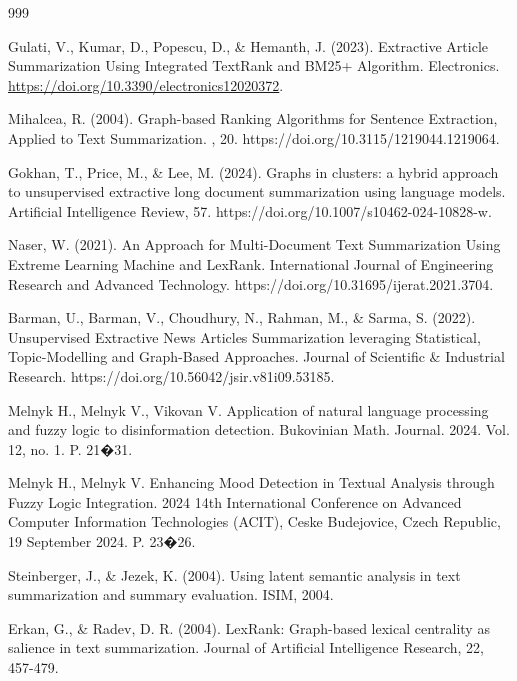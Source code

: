 \documentclass[12pt,twoside,en,win]{bmzhart}
\begin{document}
	
	\begin{thebibliography}{999}
		
		 Gulati, V., Kumar, D., Popescu, D., \& Hemanth, J. (2023). Extractive Article Summarization Using 
		Integrated TextRank and BM25+ Algorithm. Electronics. \url{https://doi.org/10.3390/electronics12020372}.
		
		 Mihalcea, R. (2004). Graph-based Ranking Algorithms for Sentence Extraction, Applied to Text 
		Summarization. , 20. https://doi.org/10.3115/1219044.1219064.
		
		 Gokhan, T., Price, M., \& Lee, M. (2024). Graphs in clusters: a hybrid approach to unsupervised 
		extractive long document summarization using language models. Artificial Intelligence Review, 57. 
		https://doi.org/10.1007/s10462-024-10828-w.
		
		 Naser, W. (2021). An Approach for Multi-Document Text Summarization Using Extreme Learning Machine 
		and LexRank. International Journal of Engineering Research and Advanced Technology. 
		https://doi.org/10.31695/ijerat.2021.3704.
		
		 Barman, U., Barman, V., Choudhury, N., Rahman, M., \& Sarma, S. (2022). Unsupervised Extractive News 
		Articles Summarization leveraging Statistical, Topic-Modelling and Graph-Based Approaches. Journal of Scientific 
		\& Industrial Research. https://doi.org/10.56042/jsir.v81i09.53185.
		
		 Melnyk H., Melnyk V., Vikovan V. Application of natural language processing and fuzzy logic to 
		disinformation detection. Bukovinian Math. Journal. 2024. Vol. 12, no. 1. P. 21�31. 
		
		 Melnyk H., Melnyk V. Enhancing Mood Detection in Textual Analysis through Fuzzy Logic Integration. 
		2024 14th International Conference on Advanced Computer Information Technologies (ACIT), Ceske Budejovice, Czech 
		Republic, 19 September 2024. P. 23�26.
		
		 Steinberger, J., \& Jezek, K. (2004). Using latent semantic analysis in text summarization and 
		summary evaluation. ISIM, 2004.
		
		 Erkan, G., \& Radev, D. R. (2004). LexRank: Graph-based lexical centrality as salience in text 
		summarization. Journal of Artificial Intelligence Research, 22, 457-479.
		
	\end{thebibliography}
	
\end{document}
